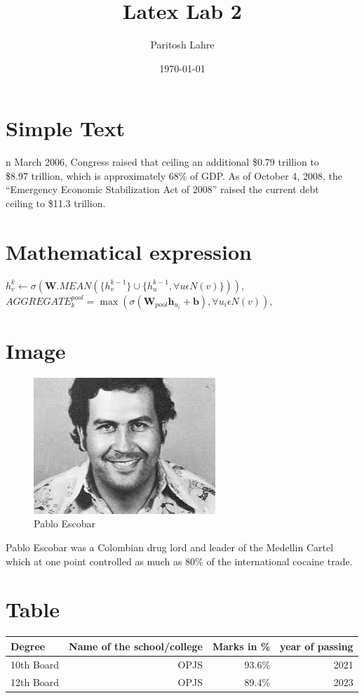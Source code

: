 \documentclass{article}
\title{Latex Lab 2}
\author{Paritosh Lahre}
\date{\today}
\begin{document}
	\maketitle
	\section{Simple Text}
	n March 2006, Congress raised that ceiling an additional \$0.79 trillion to\\
	\$8.97 trillion, which is approximately 68\% of GDP. As of October 4, 2008, the\\
	“Emergency Economic Stabilization Act of 2008” raised the current debt\\
	ceiling to \$11.3 trillion.
	
	\section{Mathematical expression}
	$h_v ^ k \leftarrow \sigma (\textbf{W} . MEAN(\{h_v ^ {k - 1}\} \cup \{h_u ^ {k - 1} , \forall \textit{u}  \epsilon N (\textit{v})\})),$\\
	$AGGREGATE_k ^{pool} = \max({\sigma (\textbf{W}_{pool} \textbf{h}_{u_i} + \textbf{b}) , \forall u_i  \epsilon  N(\textit{v})}),$\\
	
	\section{Image}
	
	\begin{figure}[h]
		\centering
		\includegraphics[width=0.7\linewidth]{download}
		\caption{Pablo Escobar}
		\label{fig:download}
	\end{figure}
	
	Pablo Escobar was a Colombian drug lord and leader of the Medellin Cartel which at one point controlled as much as 80\% of the international cocaine trade.
	
	\section{Table}
	\begin{tabular}{|l|r|r|r|} \hline
		Degree & Name of the school/college & Marks in \% & year of passing   \\\hline
		10th Board & OPJS & 93.6\% & 2021 \\
		12th Board & OPJS & 89.4\% & 2023 \\\hline
	\end{tabular}
	
\end{document}

